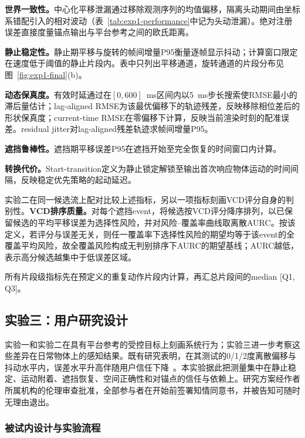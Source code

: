 \documentclass[review]{vgtc}
\begin{document}
\textbf{世界一致性。}中心化平移泄漏通过移除观测序列的均值偏移，隔离头动期间由坐标系错配引入的相对波动（表~\ref{tab:exp1-performance}中记为头动泄漏）。绝对注册误差直接度量锚点输出与平台参考之间的欧氏距离。

\textbf{静止稳定性。}静止期平移与旋转的帧间增量P95衡量逐帧显示抖动；计算窗口限定在速度低于阈值的静止片段内。表中只列出平移通道，旋转通道的片段分布见图~\ref{fig:exp1-final}(b)。

\textbf{动态保真度。}有效时延通过在$[0, 600]$~ms区间内以5~ms步长搜索使RMSE最小的滞后量估计；lag-aligned RMSE为该最优偏移下的轨迹残差，反映移除相位差后的形状保真度；current-time RMSE在零偏移下计算，反映当前渲染时刻的配准误差。residual jitter对lag-aligned残差轨迹求帧间增量P95。

\textbf{遮挡鲁棒性。}遮挡期平移误差P95在遮挡开始至完全恢复的时间窗口内计算。

\textbf{转换代价。}Start-transition定义为静止锁定解锁至输出首次响应物体运动的时间间隔，反映稳定优先策略的起动延迟。

实验二在同一候选流上配对比较上述指标，另以一项指标刻画VCD评分自身的判别性。\textbf{VCD排序质量。}对每个遮挡event，将候选按VCD评分降序排列，以已保留候选的平均平移误差为选择性风险，并对风险--覆盖率曲线取离散AURC。按该定义，若评分与误差无关，则任一覆盖率下选择性风险的期望均等于该event的全覆盖平均风险，故全覆盖风险构成无判别排序下AURC的期望基线；AURC越低，表示高分候选越集中于低误差区域。

所有片段级指标先在预定义的重复动作片段内计算，再汇总片段间的median [Q1, Q3]。

\subsection{实验三：用户研究设计}\label{sec:exp3-design}

实验一和实验二在具有平台参考的受控目标上刻画系统行为；实验三进一步考察这些差异在日常物体上的感知结果。既有研究表明，在其测试的0/1/2度离散偏移与抖动水平内，误差水平升高伴随用户信任下降~\cite{gottsacker2024artrust}。本实验据此把测量集中在静止稳定、运动附着、遮挡恢复、空间正确性和对锚点的信任与依赖上。研究方案经作者所属机构的伦理审查批准，全部参与者在开始前签署知情同意书，并被告知可随时无理由退出。

\subsubsection{被试内设计与实验流程}
\end{document}
